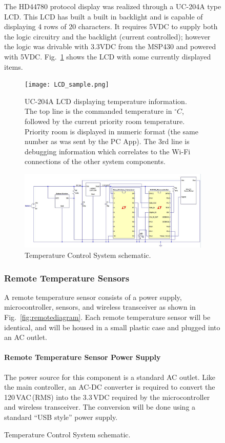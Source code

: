 \begin{figure}
The HD44780 protocol display was realized through a UC-204A type LCD.  This LCD has built a built in backlight and is capable of displaying 4 rows of 20 characters.  It requires 5VDC to supply both the logic circuitry and the backlight (current controlled); however the logic was drivable with 3.3VDC from the MSP430 and powered with 5VDC. Fig.~\ref{fig:lcd_sample} shows the LCD with some currently displayed items.

\begin{figure}
\centering
\texttt{[image: LCD\_sample.png]}
\caption{UC-204A LCD displaying temperature information.  The top line is the commanded temperature in $^\circ C$, followed by the current priority room temperature.  Priority room is displayed in numeric format (the same number as was sent by the PC App).  The 3rd line is debugging information which correlates to the Wi-Fi connections of the other system components. }
\label{fig:lcd_sample}
\end{figure}




\begin{figure} [htb]
\centering
\includegraphics[width=.99\textwidth]{Temperature_Sensor.JPG}
\caption{Temperature Control System schematic.}
\label{fig:Temperature_System}
\end{figure}


\subsubsection{Remote Temperature Sensors}
A remote temperature sensor consists of a power supply, microcontroller, sensors, and wireless transceiver as shown in Fig.~\ref{fig:remotediagram}.  Each remote temperature sensor will be identical, and will be housed in a small plastic case and plugged into an AC outlet.
\paragraph{Remote Temperature Sensor Power Supply}
The power source for this component is a standard AC outlet.  Like the main controller, an AC-DC converter is required to convert the 120\,VAC\,(RMS) into the 3.3\,VDC required by the microcontroller and wireless transceiver.  The conversion will be done using a standard ``USB style'' power supply.

\end{figure}
